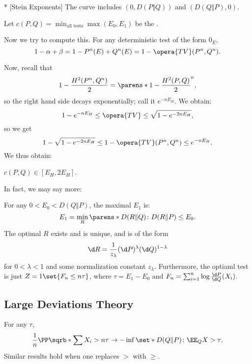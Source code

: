 \begin{fact}*
	[Stein Exponents]
	The curve includes $(0, D(P\Vert Q))$ and $(D(Q\Vert P), 0)$.
\end{fact}

\begin{defn}
	Let $c(P,Q) = \min_{\text{all tests}} \max(E_0, E_1)$ be the .
\end{defn}

Now we try to compute this. For any deterministic test of the form $0_E$, \[
	1-\alpha + \beta = 1-P^n(E) + Q^n(E) = 1 - \opera{TV} (P^n, Q^n).
\]

Now, recall that \[
	1 - \frac{H^2(P^n, Q^n)}{2} = \parens*{1 - \frac{H^2(P,Q)}{2}}^n,
\]
so the right hand side decays exponentially; call it $e^{-nE_H}$.
We obtain: \[
	1-e^{-nE_H} \leq \opera{TV} \leq \sqrt{1-e^{-2nE_H}},
\]
so we get \[
	1-\sqrt{1-e^{-2nE_H}} \leq 1-\opera{TV}(P^n, Q^n) \leq e^{-nE_H}.
\]
We thus obtain: 

\begin{fact}
	$c(P,Q) \in [E_H, 2E_H]$.
\end{fact}

In fact, we may say more:

\begin{thm}
	For any $0 < E_0 < D(Q\Vert P)$, the maximal $E_1$ is: \[
		E_1 = \min_R \parens*{D(R\Vert Q) \colon D(R\Vert P) \leq E_0}.
	\]
	The optimal $R$ exists and is unique, and is of the form \[
		\d R = \frac{1}{z_\lambda}(\d P)^\lambda (\d Q)^{1-\lambda}
	\]
	for $0 < \lambda < 1$ and some normalization constant $z_\lambda$.
	Furthermore, the optiaml test is just $Z = 1\set{F_n \leq n\tau}$, where $\tau = E_1 - E_0$ and $F_n = \sum_{i=1}^n \log\frac{\d P}{\d Q} (X_i)$.
\end{thm}

\subsection{Large Deviations Theory}

\begin{thm}
	For any $\tau$, \[
		\frac 1n \PP\sqrb*{\sum X_i > n\tau} \to -\inf \set*{D(Q\Vert P)\colon \EE_Q X > \tau}.
	\]
	Similar results hold when one replaces $>$ with $\geq$.
\end{thm}

